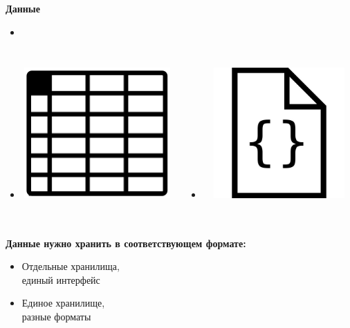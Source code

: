 \documentclass[usenames,dvipsnames, 18pt, compress, aspectratio=169]{beamer}
\begin{document}
\begin{frame}[fragile]
    \frametitle{}
    \begin{center}
        \textbf{Данные}
    \end{center}
    \begin{itemize}[leftmargin=*]
        \item <+->
    \end{itemize}

    \vspace{-40pt}

    \begin{columns}[T,onlytextwidth]
    \begin{itemize}[leftmargin=*]
        \item <+->\includegraphics[width=6cm,height=5cm]{relation.png}
    \end{itemize}

    \vspace{20pt}

    \begin{itemize}[leftmargin=*]
        \item <+->\includegraphics[width=6cm,height=5cm]{document.jpg}
    \end{itemize}
    \end{columns}
\end{frame}

\begin{frame}
    \frametitle{}
    \begin{center}
        \textbf{Данные нужно хранить в соответствующем формате:}
        \pause
        \begin{itemize}[label={\MVRightarrow}]
            \item <+-> Отдельные хранилища,\\ единый интерфейс
            \item <+-> Единое хранилище,\\ разные форматы
        \end{itemize}
    \end{center}
\end{frame}
\end{document}
